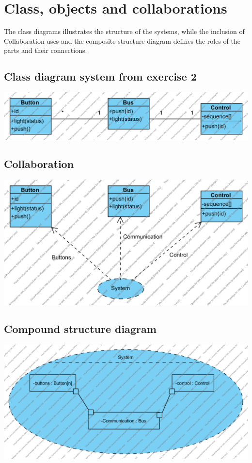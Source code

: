 \documentclass{article}
\begin{document}
\section{Class, objects and collaborations}
The class diagrams illustrates the structure of the systems, 
while the inclusion of Collaboration uses and the composite 
structure diagram defines the roles of the parts and their
connections.
\subsection{Class diagram system from exercise 2}
\includegraphics[width=0.8\linewidth]{../class1}

\subsection{Collaboration}

  \includegraphics[width=\linewidth]{../class2}

\subsection{Compound structure diagram}

  
  \includegraphics[width=\linewidth]{../comp1}
\end{document}
